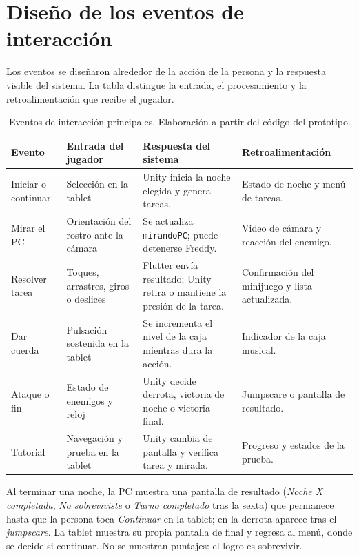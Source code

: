 \documentclass[11pt,a4paper]{article}
\newcommand{\codigo}[1]{\texttt{#1}}
\begin{document}
\section{Diseño de los eventos de interacción}

Los eventos se diseñaron alrededor de la acción de la persona y la respuesta visible del sistema. La tabla distingue la entrada, el procesamiento y la retroalimentación que recibe el jugador.

\begin{table}[ht]
\centering
\footnotesize
\begin{tabularx}{\textwidth}{@{}p{2.15cm}p{3.0cm}X X@{}}
\toprule
Evento & Entrada del jugador & Respuesta del sistema & Retroalimentación\\
\midrule
Iniciar o continuar & Selección en la tablet & Unity inicia la noche elegida y genera tareas. & Estado de noche y menú de tareas.\\
Mirar el PC & Orientación del rostro ante la cámara & Se actualiza \codigo{mirandoPC}; puede detenerse Freddy. & Video de cámara y reacción del enemigo.\\
Resolver tarea & Toques, arrastres, giros o deslices & Flutter envía resultado; Unity retira o mantiene la presión de la tarea. & Confirmación del minijuego y lista actualizada.\\
Dar cuerda & Pulsación sostenida en la tablet & Se incrementa el nivel de la caja mientras dura la acción. & Indicador de la caja musical.\\
Ataque o fin & Estado de enemigos y reloj & Unity decide derrota, victoria de noche o victoria final. & Jumpscare o pantalla de resultado.\\
Tutorial & Navegación y prueba en la tablet & Unity cambia de pantalla y verifica tarea y mirada. & Progreso y estados de la prueba.\\
\bottomrule
\end{tabularx}
\caption{Eventos de interacción principales. Elaboración a partir del código del prototipo.}
\end{table}

Al terminar una noche, la PC muestra una pantalla de resultado (\textit{Noche X completada}, \textit{No sobreviviste} o \textit{Turno completado} tras la sexta) que permanece hasta que la persona toca \textit{Continuar} en la tablet; en la derrota aparece tras el \textit{jumpscare}. La tablet muestra su propia pantalla de final y regresa al menú, donde se decide si continuar. No se muestran puntajes: el logro es sobrevivir.
\end{document}
